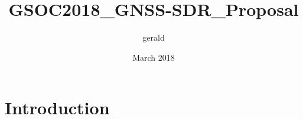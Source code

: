 \documentclass{article}
\title{GSOC2018_GNSS-SDR_Proposal}
\author{gerald }
\date{March 2018}
\begin{document}
\maketitle

\section{Introduction}
\end{document}
